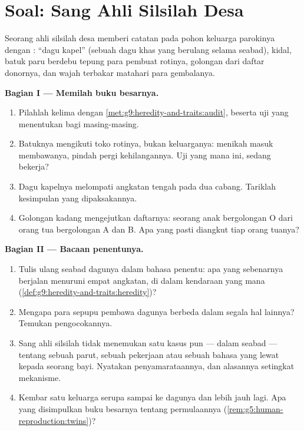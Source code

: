 \section{Soal: Sang Ahli Silsilah Desa}

\begin{problem}\label{pb:g9:heredity-and-traits:1}
Seorang ahli silsilah desa memberi catatan pada pohon
keluarga parokinya dengan : ``dagu kapel'' (sebuah dagu
khas yang berulang selama seabad), kidal, batuk paru
berdebu tepung para pembuat rotinya, golongan  dari
daftar donornya, dan wajah terbakar matahari para gembalanya.

\medskip\noindent\textbf{Bagian I --- Memilah buku
besarnya.}
\begin{enumerate}
  \item Pilahlah kelima  dengan
        \cref{met:g9:heredity-and-traits:audit}, beserta uji
        yang menentukan bagi masing-masing.
  \item Batuknya mengikuti toko rotinya, bukan keluarganya:
        menikah masuk membawanya, pindah pergi
        kehilangannya. Uji yang mana ini, sedang bekerja?
  \item Dagu kapelnya melompati angkatan tengah pada dua
        cabang. Tariklah kesimpulan yang dipaksakannya.
  \item Golongan  kadang mengejutkan daftarnya:
        seorang anak bergolongan O dari orang tua bergolongan
        A dan B. Apa yang pasti diangkut tiap orang tuanya?
\end{enumerate}

\medskip\noindent\textbf{Bagian II --- Bacaan
penentunya.}
\begin{enumerate}[resume]
  \item Tulis ulang seabad dagunya dalam bahasa penentu: apa
        yang sebenarnya berjalan menuruni empat angkatan, di
        dalam kendaraan yang mana
        (\cref{def:g9:heredity-and-traits:heredity})?
  \item Mengapa para sepupu pembawa dagunya berbeda dalam
        segala hal lainnya? Temukan pengocokannya.
  \item Sang ahli silsilah tidak menemukan satu kasus pun
        --- dalam seabad --- tentang sebuah parut, sebuah
        pekerjaan atau sebuah bahasa yang lewat kepada
        seorang bayi. Nyatakan penyamarataannya, dan
        alasannya setingkat mekanisme.
  \item Kembar satu keluarga serupa sampai ke dagunya dan
        lebih jauh lagi. Apa yang disimpulkan buku besarnya
        tentang permulaannya
        (\cref{rem:g5:human-reproduction:twins})?
\end{enumerate}


\end{problem}
